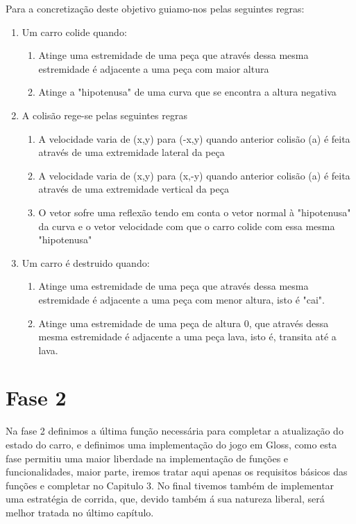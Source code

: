 \documentclass[a4paper]{report} %
\begin{document}
Para a concretização deste objetivo guiamo-nos pelas seguintes regras:
\begin{enumerate}
\item Um carro colide quando: 
\begin{enumerate}
\item Atinge uma estremidade de uma peça que através dessa mesma estremidade é adjacente a uma peça com maior altura
\item Atinge a "hipotenusa" de uma curva que se encontra a altura negativa
\end{enumerate}
\item A colisão rege-se pelas seguintes regras
\begin{enumerate}
\item A velocidade varia de (x,y) para (-x,y) quando anterior colisão (a) é feita através de uma extremidade lateral da peça
\item A velocidade varia de (x,y) para (x,-y) quando anterior colisão (a) é feita através de uma extremidade vertical da peça
\item O vetor sofre uma reflexão tendo em conta o vetor normal à "hipotenusa" da curva e o vetor velocidade com que o carro colide com essa mesma "hipotenusa"
\end{enumerate}
\item Um carro é destruido quando:
\begin{enumerate}
\item Atinge uma estremidade de uma peça que através dessa mesma estremidade é adjacente a uma peça com menor altura, isto é "cai".
\item Atinge uma estremidade de uma peça de altura 0, que através dessa mesma estremidade é adjacente a uma peça lava, isto é, transita até a lava. 
\end{enumerate}

\end{enumerate}

\label{sec:analisefase1}

\section{Fase 2}
Na fase 2 definimos a última função necessária para completar a atualização do estado do carro, e definimos uma implementação do jogo em Gloss, como esta fase permitiu uma maior liberdade na implementação de funções e funcionalidades, maior parte, iremos tratar aqui apenas os requisitos básicos das funções e completar no Capitulo 3. No final tivemos também de implementar uma estratégia de corrida, que, devido também á sua natureza liberal, será melhor tratada no último capítulo.
\end{document}
